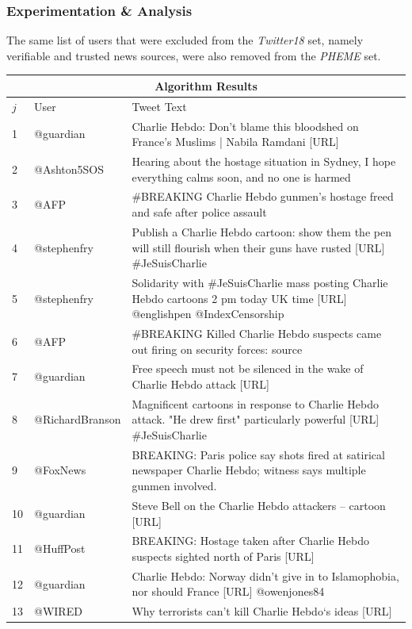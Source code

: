 \documentclass[preprint,review,12pt]{elsarticle}
\begin{document}
\subsubsection{Experimentation & Analysis}
The same list of users that were excluded from the \textit{Twitter18} set, namely verifiable and trusted news sources, were also removed from the \textit{PHEME} set.

\begin{longtable}{ |p{0.5cm}|p{4.1cm}|p{12cm}|  }
\hline
\multicolumn{3}{|c|}{Algorithm Results} \\
\hline
$j$ & User & Tweet Text \\
\hline
1 & @guardian & Charlie Hebdo: Don’t blame this bloodshed on France’s Muslims | Nabila Ramdani [URL]\\
\hline
2 & @Ashton5SOS & Hearing about the hostage situation in Sydney, I hope everything calms soon, and no one is harmed\\
\hline
3 & @AFP & #BREAKING Charlie Hebdo gunmen's hostage freed and safe after police assault\\
\hline
4 & @stephenfry & Publish a Charlie Hebdo cartoon: show them the pen will still flourish when their guns have rusted [URL] \#JeSuisCharlie\\
\hline
5 & @stephenfry & Solidarity with \#JeSuisCharlie mass posting Charlie Hebdo cartoons 2 pm today UK time [URL] @englishpen @IndexCensorship \\
\hline
6 & @AFP & \#BREAKING Killed Charlie Hebdo suspects came out firing on security forces: source \\
\hline
7 & @guardian & Free speech must not be silenced in the wake of Charlie Hebdo attack [URL] \\
\hline
8 & @RichardBranson & Magnificent cartoons in response to Charlie Hebdo attack. "He drew first" particularly powerful [URL] \#JeSuisCharlie \\
\hline
9 & @FoxNews & BREAKING: Paris police say shots fired at satirical newspaper Charlie Hebdo; witness says multiple gunmen involved. \\
\hline
10 & @guardian & Steve Bell on the Charlie Hebdo attackers – cartoon [URL] \\
\hline
11 & @HuffPost & BREAKING: Hostage taken after Charlie Hebdo suspects sighted north of Paris [URL] \\
\hline
12 & @guardian & Charlie Hebdo: Norway didn’t give in to Islamophobia, nor should France [URL] @owenjones84\\
\hline
13 & @WIRED & Why terrorists can't kill Charlie Hebdo‘s ideas [URL]\\

\end{longtable}
\end{document}

